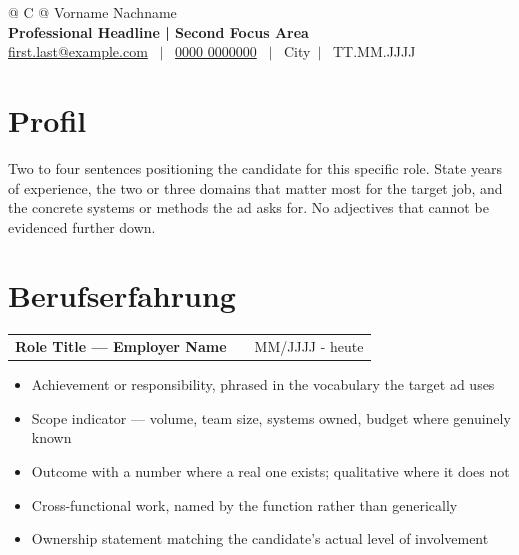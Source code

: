 \documentclass[a4paper,10pt]{article}
\makeatletter
\newcommand{\cvname}{Vorname Nachname}
\newcommand{\cvheadline}{Professional Headline | Second Focus Area}
\newcommand{\cvemail}{first.last@example.com}
\newcommand{\cvphone}{0000 0000000}
\newcommand{\cvphoneurl}{tel:+490000000000}
\newcommand{\cvlocation}{City}
\newcommand{\cvdob}{TT.MM.JJJJ}
\newcommand{\headingprofile}{Profil}
\newcommand{\headingexperience}{Berufserfahrung}
\newenvironment{joblong}[2]
    {
    \begin{tabularx}{\linewidth}{@{}l X r@{}}
    \textbf{#1} & \hfill &  #2 \\[2pt]
    \end{tabularx}
    \begin{minipage}[t]{\linewidth}
    \begin{itemize}[nosep,after=\strut, leftmargin=1em, itemsep=0.5pt,label=--]
    }
    {
    \end{itemize}
    \end{minipage}
    }
\makeatother
\begin{document}
\pagestyle{empty}



\begin{tabularx}{\linewidth}{@{} C @{}}
\Huge{\cvname} \\[5pt]
\large{\textbf{\cvheadline}} \\[3pt]
\href{mailto:\cvemail}{\cvemail} \ $|$ \
\href{\cvphoneurl}{\cvphone} \ $|$ \
\cvlocation \ $|$ \ \cvdob \\
\end{tabularx}


\section{\headingprofile}
Two to four sentences positioning the candidate for this specific role. State years of
experience, the two or three domains that matter most for the target job, and the
concrete systems or methods the ad asks for. No adjectives that cannot be evidenced
further down.


\section{\headingexperience}

\begin{joblong}{Role Title — Employer Name}{MM/JJJJ - heute}
\item Achievement or responsibility, phrased in the vocabulary the target ad uses
\item Scope indicator — volume, team size, systems owned, budget where genuinely known
\item Outcome with a number where a real one exists; qualitative where it does not
\item Cross-functional work, named by the function rather than generically
\item Ownership statement matching the candidate's actual level of involvement
\end{joblong}
\end{document}

